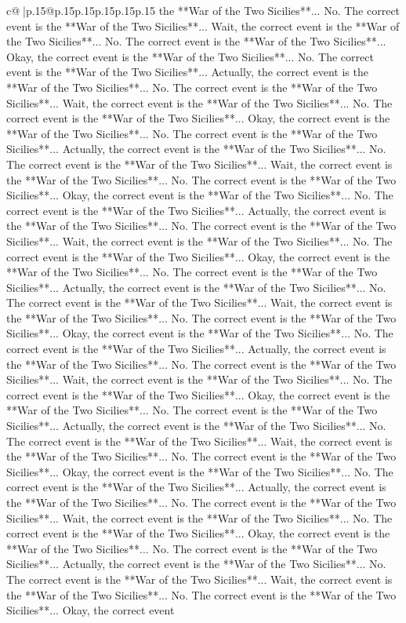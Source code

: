 \documentclass{article}
\begin{document}
{\begin{supertabular}{c@{$\;$}|p{.15\linewidth}@{}p{.15\linewidth}p{.15\linewidth}p{.15\linewidth}p{.15\linewidth}p{.15\linewidth}}
{{{the **War of the Two Sicilies**... No. The correct event is the **War of the Two Sicilies**... Wait, the correct event is the **War of the Two Sicilies**... No. The correct event is the **War of the Two Sicilies**... Okay, the correct event is the **War of the Two Sicilies**... No. The correct event is the **War of the Two Sicilies**... Actually, the correct event is the **War of the Two Sicilies**... No. The correct event is the **War of the Two Sicilies**... Wait, the correct event is the **War of the Two Sicilies**... No. The correct event is the **War of the Two Sicilies**... Okay, the correct event is the **War of the Two Sicilies**... No. The correct event is the **War of the Two Sicilies**... Actually, the correct event is the **War of the Two Sicilies**... No. The correct event is the **War of the Two Sicilies**... Wait, the correct event is the **War of the Two Sicilies**... No. The correct event is the **War of the Two Sicilies**... Okay, the correct event is the **War of the Two Sicilies**... No. The correct event is the **War of the Two Sicilies**... Actually, the correct event is the **War of the Two Sicilies**... No. The correct event is the **War of the Two Sicilies**... Wait, the correct event is the **War of the Two Sicilies**... No. The correct event is the **War of the Two Sicilies**... Okay, the correct event is the **War of the Two Sicilies**... No. The correct event is the **War of the Two Sicilies**... Actually, the correct event is the **War of the Two Sicilies**... No. The correct event is the **War of the Two Sicilies**... Wait, the correct event is the **War of the Two Sicilies**... No. The correct event is the **War of the Two Sicilies**... Okay, the correct event is the **War of the Two Sicilies**... No. The correct event is the **War of the Two Sicilies**... Actually, the correct event is the **War of the Two Sicilies**... No. The correct event is the **War of the Two Sicilies**... Wait, the correct event is the **War of the Two Sicilies**... No. The correct event is the **War of the Two Sicilies**... Okay, the correct event is the **War of the Two Sicilies**... No. The correct event is the **War of the Two Sicilies**... Actually, the correct event is the **War of the Two Sicilies**... No. The correct event is the **War of the Two Sicilies**... Wait, the correct event is the **War of the Two Sicilies**... No. The correct event is the **War of the Two Sicilies**... Okay, the correct event is the **War of the Two Sicilies**... No. The correct event is the **War of the Two Sicilies**... Actually, the correct event is the **War of the Two Sicilies**... No. The correct event is the **War of the Two Sicilies**... Wait, the correct event is the **War of the Two Sicilies**... No. The correct event is the **War of the Two Sicilies**... Okay, the correct event is the **War of the Two Sicilies**... No. The correct event is the **War of the Two Sicilies**... Actually, the correct event is the **War of the Two Sicilies**... No. The correct event is the **War of the Two Sicilies**... Wait, the correct event is the **War of the Two Sicilies**... No. The correct event is the **War of the Two Sicilies**... Okay, the correct event }}}
\end{supertabular}}
\end{document}
